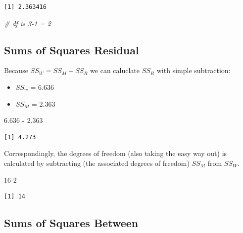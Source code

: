 \documentclass[
  11pt,
]{book}
\newenvironment{Shaded}{\begin{snugshade}}{\end{snugshade}}
\newcommand{\CommentTok}[1]{\textcolor[rgb]{0.37,0.37,0.37}{\textit{#1}}}
\newcommand{\DecValTok}[1]{\textcolor[rgb]{0.06,0.06,0.06}{#1}}
\newcommand{\FloatTok}[1]{\textcolor[rgb]{0.06,0.06,0.06}{#1}}
\newcommand{\SpecialCharTok}[1]{\textcolor[rgb]{0.43,0.43,0.43}{\textbf{#1}}}
\providecommand{\tightlist}{%
  \setlength{\itemsep}{0pt}\setlength{\parskip}{0pt}}
\begin{document}
\begin{verbatim}
[1] 2.363416
\end{verbatim}

\begin{Shaded}
\begin{Highlighting}[]
\CommentTok{\# df is 3{-}1 = 2}
\end{Highlighting}
\end{Shaded}

\hypertarget{sums-of-squares-residual}{%
\subsection{Sums of Squares Residual}\label{sums-of-squares-residual}}

Because \(SS_W = SS_M + SS_R\) we can caluclate \(SS_R\) with simple subtraction:

\begin{itemize}
\tightlist
\item
  \(SS_w\) = 6.636
\item
  \(SS_M\) = 2.363
\end{itemize}

\begin{Shaded}
\begin{Highlighting}[]
\FloatTok{6.636} \SpecialCharTok{{-}} \FloatTok{2.363}
\end{Highlighting}
\end{Shaded}

\begin{verbatim}
[1] 4.273
\end{verbatim}

Correspondingly, the degrees of freedom (also taking the easy way out) is calculated by subtracting (the associated degrees of freedom) \(SS_M\) from \(SS_W\).

\begin{Shaded}
\begin{Highlighting}[]
\DecValTok{16{-}2}
\end{Highlighting}
\end{Shaded}

\begin{verbatim}
[1] 14
\end{verbatim}

\hypertarget{sums-of-squares-between}{%
\subsection{Sums of Squares Between}\label{sums-of-squares-between}}
\end{document}

